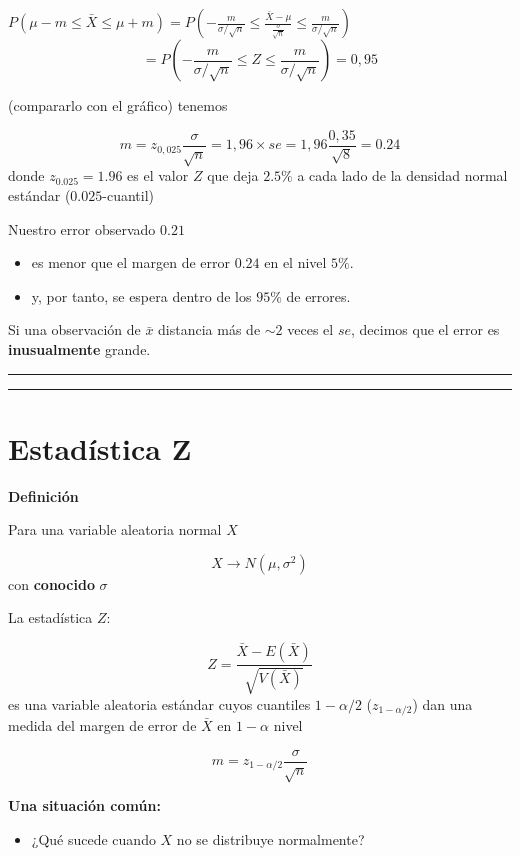 \documentclass[
]{book}
\providecommand{\tightlist}{%
  \setlength{\itemsep}{0pt}\setlength{\parskip}{0pt}}
\begin{document}
\(P(\mu-m \leq \bar{X} \leq\mu + m)=P(-\frac{m}{\sigma/\sqrt{n}} \leq \frac{\bar{X} -\mu}{\frac{\sigma}{\sqrt{n}}}\leq\frac{m}{\sigma/\sqrt{n}})\)
\[=P(-\frac{m}{\sigma/\sqrt{n}} \leq Z \leq\frac{m}{\sigma/\sqrt{n}})=0,95\]

(compararlo con el gráfico) tenemos

\[m=z_{0,025} \frac{\sigma}{\sqrt{n}}=1,96\times se=1,96\frac{0,35}{\sqrt{8}}=0.24\]
donde \(z_{0.025}=1.96\) es el valor \(Z\) que deja \(2.5\%\) a cada lado de la densidad normal estándar (\(0.025\)-cuantil)

Nuestro error observado \(0.21\)

\begin{itemize}
\item
  es menor que el margen de error \(0.24\) en el nivel \(5\%\).
\item
  y, por tanto, se espera dentro de los \(95\%\) de errores.
\end{itemize}

Si una observación de \(\bar{x}\) distancia más de \(\sim 2\) veces el \(se\), decimos que el error es \textbf{inusualmente} grande.

\begin{center}\rule{0.5\linewidth}{0.5pt}\end{center}

\begin{center}\rule{0.5\linewidth}{0.5pt}\end{center}

\hypertarget{estaduxedstica-z-2}{%
\section{Estadística Z}\label{estaduxedstica-z-2}}

\textbf{Definición}

Para una variable aleatoria normal \(X\)

\[X \rightarrow N(\mu, \sigma^2)\] con \textbf{conocido} \(\sigma\)

La estadística \(Z\):

\[Z=\frac{\bar{X}-E(\bar{X})}{\sqrt{V(\bar{X})}}\]
es una variable aleatoria estándar cuyos cuantiles \(1-\alpha/2\) (\(z_{1-\alpha/2}\)) dan una medida del margen de error de \(\bar{X}\) en \(1-\alpha\) nivel

\[m=z_{1-\alpha/2}\frac{\sigma}{\sqrt{n}}\]

\textbf{Una situación común:}

\begin{itemize}
\tightlist
\item
  ¿Qué sucede cuando \(X\) no se distribuye normalmente?
\end{itemize}
\end{document}
